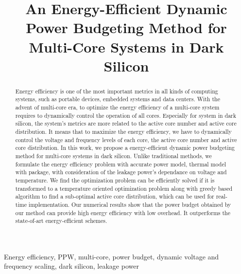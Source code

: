 \documentclass[10pt,journal,compsoc]{IEEEtran}
\begin{document}
%
\title{An Energy-Efficient Dynamic Power Budgeting Method for Multi-Core Systems in Dark Silicon}




\maketitle


\maketitle
\begin{abstract}

Energy efficiency is one of the most important metrics in all kinds of computing systems, such as portable devices, embedded systems and data centers. With the advent of multi-core era, to optimize the energy efficiency of a multi-core system requires to dynamically control the operation of all cores. Especially for system in dark silicon, the system's metrics are more related to the active core number and active core distribution. It means that to maximize the energy efficiency, we have to dynamically control the voltage and frequency levels of each core, the active core number and active core distribution. In this work, we propose a energy-efficient dynamic power budgeting method for multi-core systems in dark silicon. Unlike traditional methods, we formulate the energy efficiency problem with accurate power model, thermal model with package, with consideration of the leakage power's dependance on voltage and temperature. We find the optimization problem can be efficiently solved if it is transformed to a temperature oriented optimization problem along with greedy based algorithm to find a sub-optimal active core distribution, which can be used for real-time implementation. Our numerical results show that the power budget obtained by our method can provide high energy efficiency with low overhead. It outperforms the state-of-art energy-efficient schemes.

\end{abstract}
\begin{IEEEkeywords}
Energy efficiency, PPW, multi-core, power budget, dynamic voltage and frequency scaling, dark silicon, leakage power
\end{IEEEkeywords}
\end{document}
